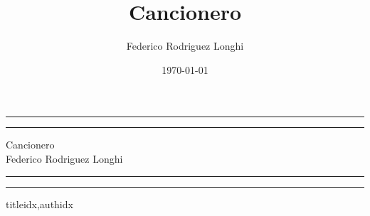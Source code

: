 \documentclass[11pt,a4paper]{article}
\newcommand{\autor}{Federico Rodriguez Longhi}
\begin{document}
\title{Cancionero}
\author{Federico Rodriguez Longhi}		
\date{\today}

\begin{titlepage}
\centering
\rule{\textwidth}{1pt}\par
\vspace{2pt}\vspace{-\baselineskip}
\rule{\textwidth}{0.4pt}\par
\vspace{20pt}
\Huge{Cancionero}\\
\vfill
\large{\autor}
\vspace{20pt}\\
\rule{\textwidth}{0.4pt}\par
\vspace{2pt}\vspace{-\baselineskip}
\rule{\textwidth}{1pt}\par
\end{titlepage}

\begin{songs}{titleidx,authidx}
	





\end{songs}
\end{document}
